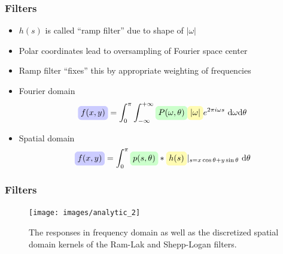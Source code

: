 \begin{frame}
	\frametitle{Filters}

	\begin{itemize}
		\setlength\itemsep{0.3cm}
		\item $h(s)$ is called ``ramp filter'' due to shape of $|\omega|$
		\item Polar coordinates lead to oversampling of Fourier space center
		\item Ramp filter ``fixes'' this by appropriate weighting of frequencies

		\item Fourier domain
		      \begin{equation}
			      \tikz[baseline]{\node[fill=blue!20,anchor=base, rounded corners] (f2) {$f(x,y)$};}%
			      = \int_0^\pi \int_{-\infty}^{+\infty}
			      \tikz[baseline]{\node[fill=green!20,anchor=base, rounded corners] (f2) {${P(\omega, \theta)}$};}%
			      \tikz[baseline]{\node[fill=yellow!30,anchor=base, rounded corners] (f2) {$|\omega|$};}%
			      e^{2 \pi i \omega s} \ \textnormal d\omega \textnormal d\theta
		      \end{equation}
		\item Spatial domain
		      \begin{equation}
			      \label{eqn:ct_analytic_2}
			      \tikz[baseline]{\node[fill=blue!20,anchor=base, rounded corners] (f2) {$f(x,y)$};}%
			      = \int_{0}^\pi
			      \tikz[baseline]{\node[fill=green!20,anchor=base, rounded corners] (f2) {${p(s, \theta)}$};}%
			      *
			      \tikz[baseline]{\node[fill=yellow!30,anchor=base, rounded corners] (f2) {$h(s)$};}%
			      |_{s=x \cos \theta + y \sin \theta} \ \textnormal d\theta
		      \end{equation}
	\end{itemize}

\end{frame}


\begin{frame}
	\frametitle{Filters}

	\begin{figure}[tbp]
		\centering
		\texttt{[image: images/analytic\_2]}
		\caption{The responses in frequency domain as well as the discretized spatial domain kernels of the Ram-Lak and Shepp-Logan filters.}
	\end{figure}
\end{frame}

